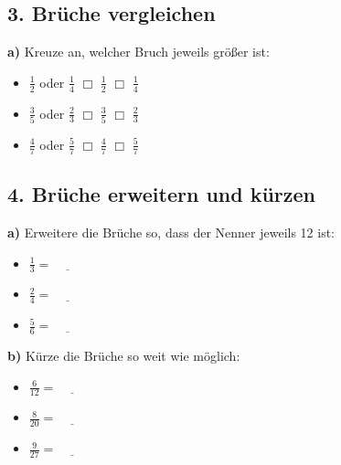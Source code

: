 \subsection*{3. Brüche vergleichen}
\textbf{a)} Kreuze an, welcher Bruch jeweils größer ist:

\begin{itemize}
  \item $\frac{1}{2}$ oder $\frac{1}{4}$ \hspace{1cm} $\Box$ $\frac{1}{2}$ \hspace{1cm} $\Box$ $\frac{1}{4}$
  \item $\frac{3}{5}$ oder $\frac{2}{3}$ \hspace{1cm} $\Box$ $\frac{3}{5}$ \hspace{1cm} $\Box$ $\frac{2}{3}$
  \item $\frac{4}{7}$ oder $\frac{5}{7}$ \hspace{1cm} $\Box$ $\frac{4}{7}$ \hspace{1cm} $\Box$ $\frac{5}{7}$
\end{itemize}

\subsection*{4. Brüche erweitern und kürzen}
\textbf{a)} Erweitere die Brüche so, dass der Nenner jeweils 12 ist:

\begin{itemize}
  \item $\frac{1}{3} = \underline{\hspace{1cm}}$
  \item $\frac{2}{4} = \underline{\hspace{1cm}}$
  \item $\frac{5}{6} = \underline{\hspace{1cm}}$
\end{itemize}

\textbf{b)} Kürze die Brüche so weit wie möglich:

\begin{itemize}
  \item $\frac{6}{12} = \underline{\hspace{1cm}}$
  \item $\frac{8}{20} = \underline{\hspace{1cm}}$
  \item $\frac{9}{27} = \underline{\hspace{1cm}}$
\end{itemize}

